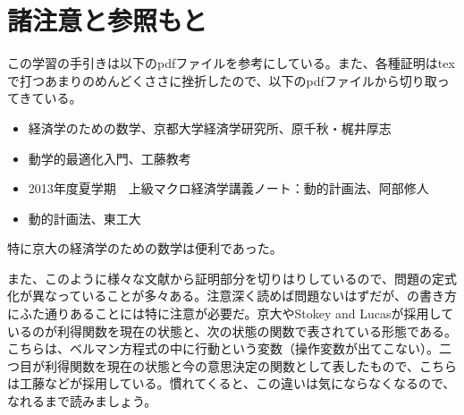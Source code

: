 \documentclass{jsarticle}
\begin{document}
\section{諸注意と参照もと}
この学習の手引きは以下のpdfファイルを参考にしている。また、各種証明はtexで打つあまりのめんどくささに挫折したので、以下のpdfファイルから切り取ってきている。
\begin{itemize}
\item 経済学のための数学、京都大学経済学研究所、原千秋・梶井厚志
\item 動学的最適化入門、工藤教考
\item 2013年度夏学期　上級マクロ経済学講義ノート：動的計画法、阿部修人
\item 動的計画法、東工大
\end{itemize}
特に京大の経済学のための数学は便利であった。

また、このように様々な文献から証明部分を切りはりしているので、問題の定式化が異なっていることが多々ある。注意深く読めば問題ないはずだが、の書き方にふた通りあることには特に注意が必要だ。京大やStokey and Lucasが採用しているのが利得関数を現在の状態と、次の状態の関数で表されている形態である。こちらは、ベルマン方程式の中に行動という変数（操作変数が出てこない）。二つ目が利得関数を現在の状態と今の意思決定の関数として表したもので、こちらは工藤などが採用している。慣れてくると、この違いは気にならなくなるので、なれるまで読みましょう。
\end{document}
